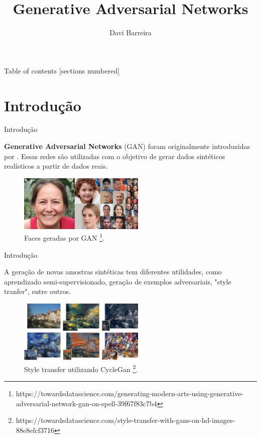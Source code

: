 \documentclass[10pt]{beamer}
\title{Generative Adversarial Networks}
\subtitle{}
\date{}
\author{Davi Barreira}
\institute{FGV - Escola de Matemática Aplicada}
\begin{document}
\maketitle

\begin{frame}{Table of contents}
  [sections numbered]
  \tableofcontents[hideallsubsections]
\end{frame}

\AtBeginSection{}
\section[Introdução]{Introdução}
\begin{frame}[fragile]{Introdução}

	\textbf{Generative Adversarial Networks} (GAN)
	foram originalmente introduzidas por \citet{goodfellow2014}.
	Essas redes são utilizadas com o objetivo de gerar
	dados sintéticos realísticos a partir de dados reais.

    \begin{figure}[H]
        \centering
        \includegraphics[width=6cm]{images/gans-faces.png}
        \caption{Faces geradas por GAN
        \footnote{https://towardsdatascience.com/generating-modern-arts-using-generative-adversarial-network-gan-on-spell-39f67f83c7b4}.}
    \end{figure}

\end{frame}

\begin{frame}[fragile]{Introdução}

	A geração de novas amostras sintéticas tem diferentes utilidades,
	como aprendizado semi-supervisionado, geração de exemplos
	adversariais, "style tranfer", entre outros.

    \begin{figure}[H]
        \centering
        \includegraphics[width=6cm]{images/style-transfer.jpeg}
        \caption{Style transfer utilizando CycleGan
        \footnote{https://towardsdatascience.com/style-transfer-with-gans-on-hd-images-88e8efcf3716}.}
    \end{figure}


\end{frame}
\end{document}
